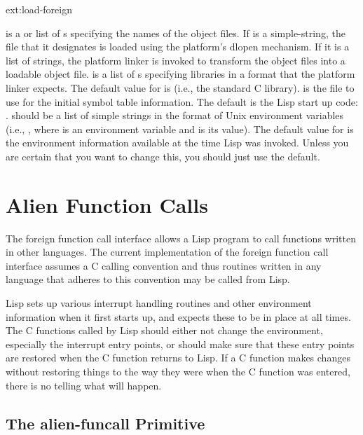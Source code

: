 \begin{defun}{ext:}{load-foreign}{%
    }
  
   is a  or list of
  s specifying the names of the object files. If
   is a simple-string, the file that it designates is
  loaded using the platform's dlopen mechanism. If it is a list of
  strings, the platform linker  is invoked to transform the
  object files into a loadable object file.  is a list
  of s specifying libraries in a format that the
  platform linker expects. The default value for  is
   (i.e., the standard C library).  is
  the file to use for the initial symbol table information. The
  default is the Lisp start up code: . 
  should be a list of simple strings in the format of Unix environment
  variables (i.e., , where  is an
  environment variable and  is its value). The default value
  for  is the environment information available at the time
  Lisp was invoked. Unless you are certain that you want to change
  this, you should just use the default.
\end{defun}


\section{Alien Function Calls}

The foreign function call interface allows a Lisp program to call functions
written in other languages.  The current implementation of the foreign
function call interface assumes a C calling convention and thus routines
written in any language that adheres to this convention may be called from
Lisp.

Lisp sets up various interrupt handling routines and other environment
information when it first starts up, and expects these to be in place at all
times.  The C functions called by Lisp should either not change the
environment, especially the interrupt entry points, or should make sure
that these entry points are restored when the C function returns to Lisp.
If a C function makes changes without restoring things to the way they were
when the C function was entered, there is no telling what will happen.


\subsection{The alien-funcall Primitive}

